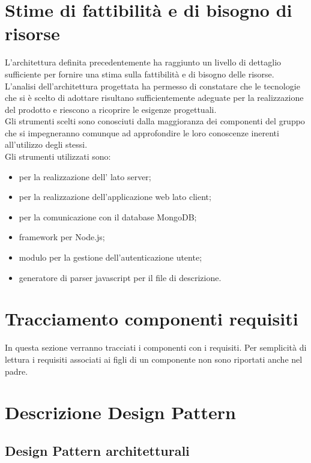 \section{Stime di fattibilità e di bisogno di risorse}
L'architettura definita precedentemente ha raggiunto un livello di dettaglio sufficiente per fornire una stima sulla fattibilità e di bisogno delle risorse.\\
L'analisi dell'architettura progettata ha permesso di constatare che le tecnologie che si è scelto di adottare risultano sufficientemente adeguate per la realizzazione del prodotto e riescono a ricoprire le esigenze progettuali.\\
Gli strumenti scelti sono conosciuti dalla maggioranza dei componenti del gruppo che si impegneranno comunque ad approfondire le loro conoscenze inerenti all'utilizzo degli stessi.\\
Gli strumenti utilizzati sono:
\begin{itemize}
\item {} per la realizzazione dell' lato server;
\item {} per la realizzazione dell'applicazione web lato client;
\item {} per la comunicazione con il database MongoDB;
\item {} framework per Node.js;
\item {} modulo per la gestione dell'autenticazione utente;
\item {} generatore di parser javascript per il file di descrizione.
\end{itemize}

\section{Tracciamento componenti requisiti}
In questa sezione verranno tracciati i componenti con i requisiti. Per semplicità di lettura i requisiti associati ai figli di un componente non sono riportati anche nel padre.


\newpage
\appendix
\section{Descrizione Design Pattern} %

\subsection{Design Pattern architetturali}
